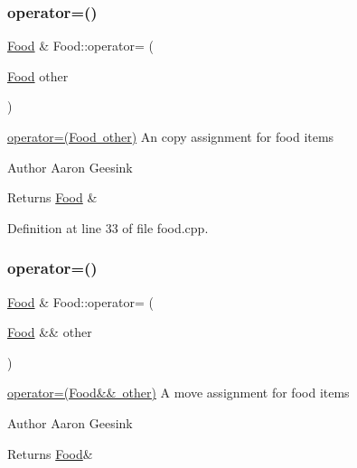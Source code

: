 \subsubsection{\texorpdfstring{operator=()}{operator=()}\hspace{0.1cm}{\footnotesize\ttfamily [1/2]}}
{\footnotesize\ttfamily \mbox{\hyperlink{class_food}{Food}} \& Food\+::operator= (\begin{DoxyParamCaption}\item[{\mbox{\hyperlink{class_food}{Food}}}]{other }\end{DoxyParamCaption})}



\mbox{\hyperlink{class_food_abe2267ba02f1b812c71028f427d92d81}{operator=(\+Food other)}} An copy assignment for food items 

\begin{DoxyAuthor}{Author}
Aaron Geesink 
\end{DoxyAuthor}
\begin{DoxyReturn}{Returns}
\mbox{\hyperlink{class_food}{Food}} \& 
\end{DoxyReturn}


Definition at line 33 of file food.\+cpp.

\mbox{\label{class_food_a0ba9d6f416f396bc8e4a1c2ad519d3eb}} 
\subsubsection{\texorpdfstring{operator=()}{operator=()}\hspace{0.1cm}{\footnotesize\ttfamily [2/2]}}
{\footnotesize\ttfamily \mbox{\hyperlink{class_food}{Food}} \& Food\+::operator= (\begin{DoxyParamCaption}\item[{\mbox{\hyperlink{class_food}{Food}} \&\&}]{other }\end{DoxyParamCaption})}



\mbox{\hyperlink{class_food_a0ba9d6f416f396bc8e4a1c2ad519d3eb}{operator=(\+Food\&\& other)}} A move assignment for food items 

\begin{DoxyAuthor}{Author}
Aaron Geesink 
\end{DoxyAuthor}
\begin{DoxyReturn}{Returns}
\mbox{\hyperlink{class_food}{Food}}\& 
\end{DoxyReturn}


